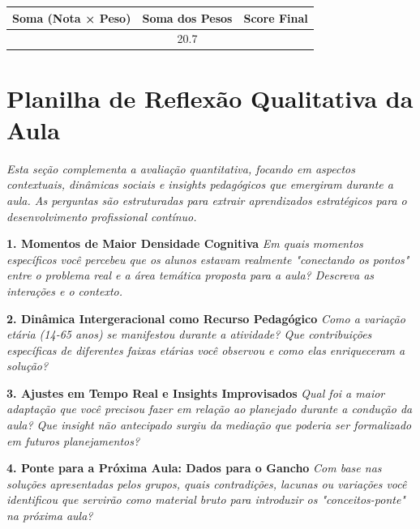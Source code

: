 \documentclass{lesson_plan}
\begin{document}
\begin{center}
\begin{tabular}{|c|c|c|}
\hline
\textbf{Soma (Nota × Peso)} & \textbf{Soma dos Pesos} & \textbf{Score Final} \\
\hline
 & 20.7 & \\
\hline
\end{tabular}
\end{center}

\newpage

\section{Planilha de Reflexão Qualitativa da Aula}
\textit{
Esta seção complementa a avaliação quantitativa, focando em aspectos contextuais, dinâmicas sociais e insights pedagógicos que emergiram durante a aula. As perguntas são estruturadas para extrair aprendizados estratégicos para o desenvolvimento profissional contínuo.}

\vspace{0.5cm}

\textbf{1. Momentos de Maior Densidade Cognitiva}
\textit{Em quais momentos específicos você percebeu que os alunos estavam realmente "conectando os pontos" entre o problema real e a área temática proposta para a aula? Descreva as interações e o contexto.}
\vspace{6em}

\textbf{2. Dinâmica Intergeracional como Recurso Pedagógico}
\textit{Como a variação etária (14-65 anos) se manifestou durante a atividade? Que contribuições específicas de diferentes faixas etárias você observou e como elas enriqueceram a solução?}
\vspace{6em}

\textbf{3. Ajustes em Tempo Real e Insights Improvisados}
\textit{Qual foi a maior adaptação que você precisou fazer em relação ao planejado durante a condução da aula? Que insight não antecipado surgiu da mediação que poderia ser formalizado em futuros planejamentos?}
\vspace{6em}

\textbf{4. Ponte para a Próxima Aula: Dados para o Gancho}
\textit{Com base nas soluções apresentadas pelos grupos, quais contradições, lacunas ou variações você identificou que servirão como material bruto para introduzir os "conceitos-ponte" na próxima aula?}
\vspace{6em}
\end{document}
